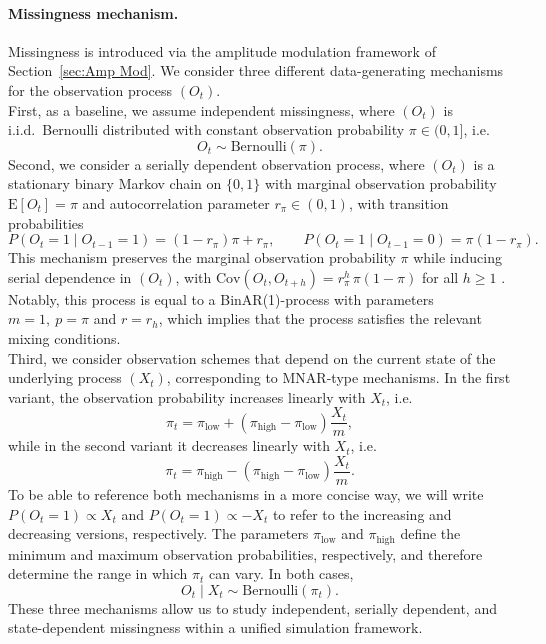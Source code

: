 ﻿\documentclass[12pt,a4paper]{scrreprt}
\theoremstyle{definition}
\begin{document}
\paragraph{Missingness mechanism.}
Missingness is introduced via the amplitude modulation framework of 
Section~\ref{sec:Amp Mod}. We consider three different data-generating mechanisms 
for the observation process $(O_t)$.\\
First, as a baseline, we assume independent missingness, where 
$(O_t)$ is i.i.d.\ Bernoulli distributed with constant observation probability 
$\pi \in (0,1]$, i.e.
\[
O_t \sim \mathrm{Bernoulli}(\pi).
\]
Second, we consider a serially dependent observation process, where 
$(O_t)$ is a stationary binary Markov chain on $\{0,1\}$ with marginal 
observation probability $\mathrm{E}[O_t] = \pi$ and autocorrelation 
parameter $r_{\pi} \in (0,1)$, with transition probabilities
\[
    P(O_t = 1 \mid O_{t-1} = 1) = (1-r_{\pi})\pi+ r_{\pi}, \qquad
    P(O_t = 1 \mid O_{t-1} = 0) = \pi(1-r_{\pi}).
\]
This mechanism preserves the marginal observation probability $\pi$ 
while inducing serial dependence in $(O_t)$, with 
$\mathrm{Cov}(O_t, O_{t+h}) = r_{\pi}^h\,\pi(1-\pi)$ for all $h \geq 1$ 
\citep[p.~139]{Weiss2018}. Notably, this process is equal to a BinAR(1)-process 
with parameters $m =1,~p = \pi$ and $r = r_h$, which implies that the process 
satisfies the relevant mixing conditions.\\
Third, we consider observation schemes that depend on the current state of 
the underlying process $(X_t)$, corresponding to MNAR-type mechanisms. In 
the first variant, the observation probability increases linearly with $X_t$, i.e.
\[
\pi_t = \pi_{\text{low}} + (\pi_{\text{high}} - \pi_{\text{low}})\frac{X_t}{m},
\]
while in the second variant it decreases linearly with $X_t$, i.e.
\[
\pi_t = \pi_{\text{high}} - (\pi_{\text{high}} - \pi_{\text{low}})\frac{X_t}{m}.
\]
To be able to reference both mechanisms in a more concise way, we will write \linebreak $P(O_t= 1)\propto X_t$ 
and $P(O_t=1)\propto-X_t$ to refer to the increasing and decreasing versions, respectively. 
The parameters $\pi_{\text{low}}$ and $\pi_{\text{high}}$ define the minimum and maximum observation probabilities, 
respectively, and therefore determine the range in which $\pi_t$ can vary. In both cases,
\[
O_t \mid X_t \sim \mathrm{Bernoulli}(\pi_t).
\]
These three mechanisms allow us to study independent, serially dependent, 
and state-dependent missingness within a unified simulation framework.
\end{document}
